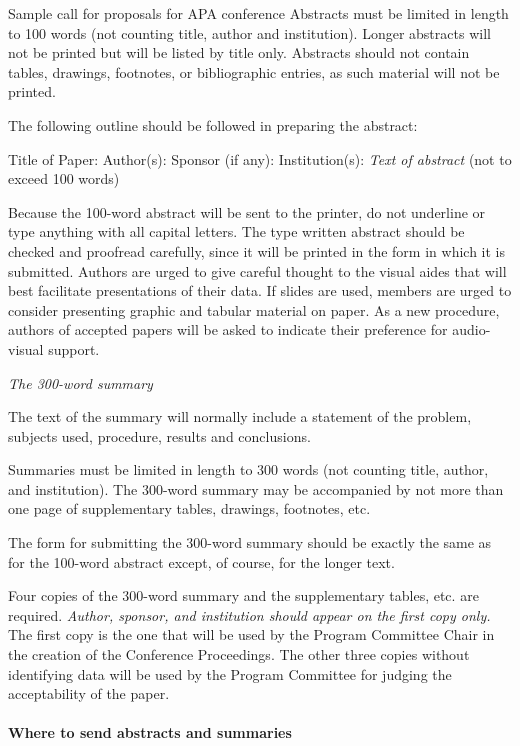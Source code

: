 \begin{refsection}
\begin{apatextbox}{Sample call for proposals for APA conference}
Abstracts must be limited in length to 100 words (not counting title, author and institution). Longer abstracts will not be printed but will be listed by title only. Abstracts should not contain tables, drawings, footnotes, or bibliographic entries, as such material will not be printed.

The following outline should be followed in preparing the abstract:

Title of Paper:
Author(s): Sponsor (if any):
Institution(s):
 \emph{Text of abstract} (not to exceed 100 words)

Because the 100-word abstract will be sent to the printer, do not underline or type anything with all capital letters. The type written abstract should be checked and proofread carefully, since it will be printed in the form in which it is submitted. Authors are urged to give careful thought to the visual aides that will best facilitate presentations of their data. If slides are used, members are urged to consider presenting graphic and tabular material on paper. As a new procedure, authors of accepted papers will be asked to indicate their preference for audio-visual support.

\emph{The 300-word summary}

The text of the summary will normally include a statement of the problem, subjects used, procedure, results and conclusions.

Summaries must be limited in length to 300 words (not counting title, author, and institution). The 300-word summary may be accompanied by not more than one page of supplementary tables, drawings, footnotes, etc.

The form for submitting the 300-word summary should be exactly the same as for the 100-word abstract except, of course, for the longer text.

Four copies of the 300-word summary and the supplementary tables, etc. are required. \emph{Author, sponsor, and institution should appear on the first copy only.} The first copy is the one that will be used by the Program Committee Chair in the creation of the Conference Proceedings. The other three copies without identifying data will be used by the Program Committee for judging the acceptability of the paper.

\paragraph{Where to send abstracts and summaries}
\label{wheretosendabstractsandsummaries}


\end{apatextbox}
\end{refsection}
